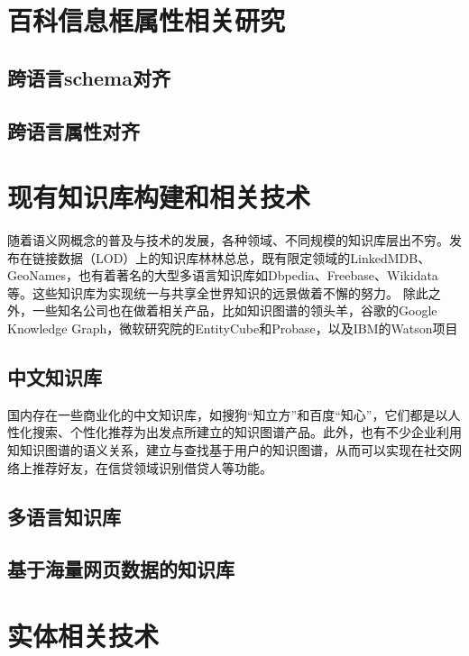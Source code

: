 \section{百科信息框属性相关研究}
\label{sec:property-research}

\subsection{跨语言schema对齐}

\subsection{跨语言属性对齐}


\section{现有知识库构建和相关技术}
\label{sec:knowledgebase-research}

随着语义网概念的普及与技术的发展，各种领域、不同规模的知识库层出不穷。发布在链接数据（LOD）上的知识库林林总总，既有限定领域的LinkedMDB\cite{erxleben2014introducing}、GeoNames\cite{wick2011geonames}，也有着著名的大型多语言知识库如Dbpedia、Freebase、Wikidata等。这些知识库为实现统一与共享全世界知识的远景做着不懈的努力。
除此之外，一些知名公司也在做着相关产品，比如知识图谱的领头羊，谷歌的Google Knowledge Graph\cite{singhal2012introducing}，微软研究院的EntityCube\cite{nie2012statistical}和Probase\cite{wu2012probase}，以及IBM的Watson项目\cite{ferrucci2012introduction}


\subsection{中文知识库}
国内存在一些商业化的中文知识库，如搜狗“知立方”和百度“知心”，它们都是以人性化搜索、个性化推荐为出发点所建立的知识图谱产品。此外，也有不少企业利用知知识图谱的语义关系，建立与查找基于用户的知识图谱，从而可以实现在社交网络上推荐好友，在信贷领域识别借贷人等功能。

\subsection{多语言知识库}

\subsection{基于海量网页数据的知识库}


\section{实体相关技术}
\label{sec:entity-research}

